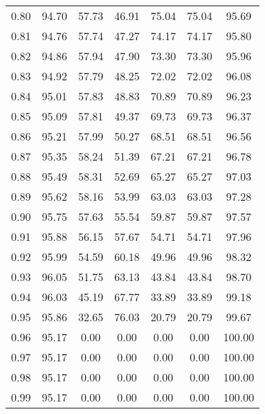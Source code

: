 \begin{tabular}{|c|c|c|c|c|c|c|}
      0.80 &     94.70 &     57.73 &      46.91 &   75.04 &      75.04 &         95.69 \\
      0.81 &     94.76 &     57.74 &      47.27 &   74.17 &      74.17 &         95.80 \\
      0.82 &     94.86 &     57.94 &      47.90 &   73.30 &      73.30 &         95.96 \\
      0.83 &     94.92 &     57.79 &      48.25 &   72.02 &      72.02 &         96.08 \\
      0.84 &     95.01 &     57.83 &      48.83 &   70.89 &      70.89 &         96.23 \\
      0.85 &     95.09 &     57.81 &      49.37 &   69.73 &      69.73 &         96.37 \\
      0.86 &     95.21 &     57.99 &      50.27 &   68.51 &      68.51 &         96.56 \\
      0.87 &     95.35 &     58.24 &      51.39 &   67.21 &      67.21 &         96.78 \\
      0.88 &     95.49 &     58.31 &      52.69 &   65.27 &      65.27 &         97.03 \\
      0.89 &     95.62 &     58.16 &      53.99 &   63.03 &      63.03 &         97.28 \\
      0.90 &     95.75 &     57.63 &      55.54 &   59.87 &      59.87 &         97.57 \\
      0.91 &     95.88 &     56.15 &      57.67 &   54.71 &      54.71 &         97.96 \\
      0.92 &     95.99 &     54.59 &      60.18 &   49.96 &      49.96 &         98.32 \\
      0.93 &     96.05 &     51.75 &      63.13 &   43.84 &      43.84 &         98.70 \\
      0.94 &     96.03 &     45.19 &      67.77 &   33.89 &      33.89 &         99.18 \\
      0.95 &     95.86 &     32.65 &      76.03 &   20.79 &      20.79 &         99.67 \\
      0.96 &     95.17 &      0.00 &       0.00 &    0.00 &       0.00 &        100.00 \\
      0.97 &     95.17 &      0.00 &       0.00 &    0.00 &       0.00 &        100.00 \\
      0.98 &     95.17 &      0.00 &       0.00 &    0.00 &       0.00 &        100.00 \\
      0.99 &     95.17 &      0.00 &       0.00 &    0.00 &       0.00 &        100.00 \\
\bottomrule
\end{tabular}
